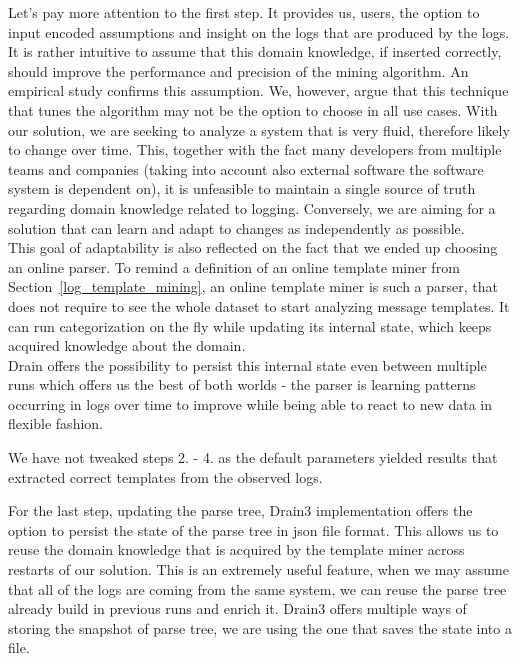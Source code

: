 Let's pay more attention to the first step. It provides us, users, the option to input encoded assumptions and insight on the logs that are produced by the logs.
It is rather intuitive to assume that this domain knowledge, if inserted correctly, should improve the performance and precision of the mining algorithm. An empirical study \cite{he2016} confirms this assumption.
We, however, argue that this technique that tunes the algorithm may not be the option to choose in all use cases. With our solution, we are seeking to analyze a system that is very fluid, therefore likely to change over time. This, together with the fact many developers from multiple teams and companies (taking into account also external software the software system is dependent on), it is unfeasible to maintain a single source of truth regarding domain knowledge related to logging. Conversely, we are aiming for a solution that can learn and adapt to changes as independently as possible.\\

This goal of adaptability is also reflected on the fact that we ended up choosing an online parser.
To remind a definition of an online template miner from Section~\ref{log_template_mining}, an online template miner is such a parser, that does not require to see the whole dataset to start analyzing message templates. It can run categorization on the fly while updating its internal state, which keeps acquired knowledge about the domain.\\
Drain offers the possibility to persist this internal state even between multiple runs which offers us the best of both worlds - the parser is learning patterns occurring in logs over time to improve while being able to react to new data in flexible fashion.

We have not tweaked steps 2. - 4. as the default parameters \cite{ibmdrain3} yielded results that extracted correct templates from the observed logs.

For the last step, updating the parse tree, Drain3 implementation offers the option to persist the state of the parse tree in json file format. This allows us to reuse the  domain knowledge that is acquired by the template miner across restarts of our solution.
This is an extremely useful feature, when we may assume that all of the logs are coming from the same system, we can reuse the parse tree already build in previous runs and enrich it.
Drain3 offers multiple ways of storing the snapshot of parse tree, we are using the one that saves the state into a file.

